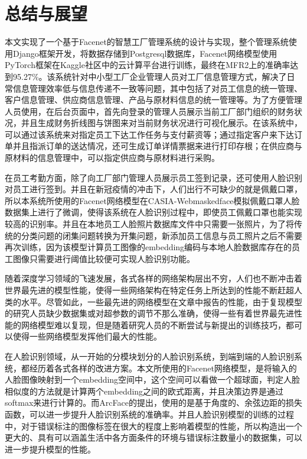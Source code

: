 \section*{总结与展望}

本文实现了一个基于Facenet的智慧工厂管理系统的设计与实现，整个管理系统使用Django框架开发，将数据存储到Postgresql数据库，Facenet网络模型使用PyTorch框架在Kaggle社区中的云计算平台进行训练，最终在MFR2上的准确率达到95.27\%。该系统针对中小型工厂企业管理人员对工厂信息管理方式，解决了日常信息管理效率低与信息传递不一致等问题，其中包括了对员工信息的统一管理、客户信息管理、供应商信息管理、产品与原材料信息的统一管理等。为了方便管理人员使用，在后台页面中，首先向登录的管理人员展示当前工厂部门组织的财务状况，并且生成财务折线图与饼图来对当前财务状况进行可视化展示。在该系统中，可以通过该系统来对指定员工下达工作任务与支付薪资等；通过指定客户来下达订单并且指派订单的送达情况，还可生成订单详情票据来进行打印存根；在供应商与原材料的信息管理中，可以指定供应商与原材料进行采购。

在员工考勤方面，除了向工厂部门管理人员展示员工签到记录，还可使用人脸识别对员工进行签到。并且在新冠疫情的冲击下，人们出行不可缺少的就是佩戴口罩，所以本系统所使用的Facenet网络模型在CASIA-Webmaskedface模拟佩戴口罩人脸数据集上进行了微调，使得该系统在人脸识别过程中，即使员工佩戴口罩也能实现较高的识别率。并且在本地员工人脸照片数据库文件中只需要一张照片，为了将传统的分类问题的闭集问题转换为开集问题，新添加员工信息与员工照片之后不需要再次训练，因为该模型计算员工图像的embedding编码与本地人脸数据库存在的员工图像只需要进行阈值比较便可实现人脸识别功能。

随着深度学习领域的飞速发展，各式各样的网络架构层出不穷，人们也不断冲击着世界最先进的模型性能，使得一些网络架构在特定任务上所达到的性能不断赶超人类的水平。尽管如此，一些最先进的网络模型在文章中报告的性能，由于复现模型的研究人员缺少数据集或对超参数的调节不那么准确，使得一些有着世界最先进性能的网络模型难以复现，但是随着研究人员的不断尝试与新提出的训练技巧，都可以使得一些网络模型发挥他们最大的性能。

在人脸识别领域，从一开始的分模块划分的人脸识别系统，到端到端的人脸识别系统，都经历着各式各样的改进方案。本文所使用的Facenet网络模型，是将输入的人脸图像映射到一个embedding空间中，这个空间可以看做一个超球面，判定人脸相似度的方法就是计算两个embedding之间的欧式距离，并且决策边界是通过softmax来进行计算的。而ArcFace\cite{arcface}的提出，使用的是基于角度的、余弦边距的损失函数，可以进一步提升人脸识别系统的准确率。并且人脸识别模型的训练的过程中，对于错误标注的图像标签在很大的程度上影响着模型的性能，所以构造出一个更大的、具有可以涵盖生活中各方面条件的环境与错误标注数量小的数据集，可以进一步提升模型的性能。